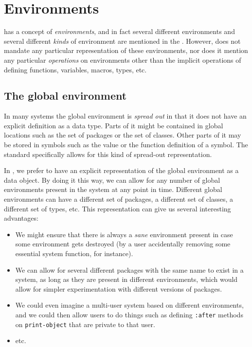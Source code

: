 \chapter{Environments}
\label{chap-environments}

\commonlisp{} has a concept of \emph{environments}, and in fact several
different environments and several different \emph{kinds} of
environment are mentioned in the \hs{}.  However, \commonlisp{} does not
mandate any particular representation of these environments, nor does
it mention any particular \emph{operations} on environments other than
the implicit operations of defining functions, variables, macros,
types, etc. 

\section{The global environment}
\label{sec-the-global-environment}

In many \commonlisp{} systems the global environment is \emph{spread out} in
that it does not have an explicit definition as a data type.  Parts of
it might be contained in global locations such as the set of packages
or the set of classes.  Other parts of it may be stored in symbols
such as the value or the function definition of a symbol.  The
standard specifically allows for this kind of spread-out
representation.  

In \sysname{}, we prefer to have an explicit representation of the
global environment as a data object.  By doing it this way, we can
allow for any number of global environments present in the system at
any point in time.  Different global environments can have a different
set of packages, a different set of classes, a different set of types,
etc.  This representation can give us several interesting advantages: 

\begin{itemize}
\item We might ensure that there is always a \emph{sane} environment
  present in case some environment gets destroyed (by a user
  accidentally removing some essential system function, for instance).
\item We can allow for several different packages with the same name
  to exist in a system, as long as they are present in different
  environments, which would allow for simpler experimentation with
  different versions of packages. 
\item We could even imagine a multi-user system based on different
  environments, and we could then allow users to do things such as
  defining \texttt{:after} methods on \texttt{print-object} that are
  private to that user. 
\item etc.
\end{itemize}

